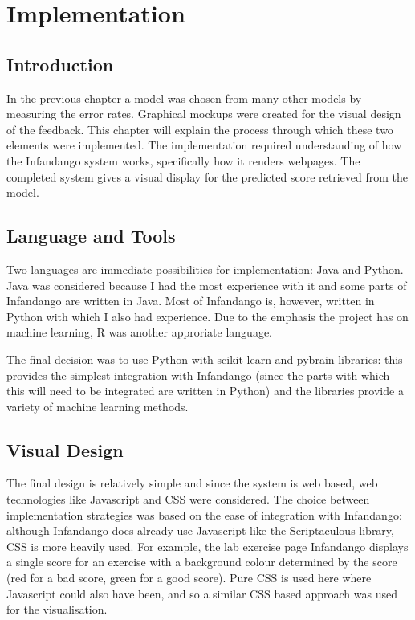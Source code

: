 \chapter{Implementation}
\label{implementation}
\section{Introduction}
In the previous chapter a model was chosen from many other models by measuring the error rates. Graphical mockups were created for the visual design of the feedback. This chapter will explain the process through which these two elements were implemented. The implementation required understanding of how the Infandango system works, specifically how it renders webpages. The completed system gives a visual display for the predicted score retrieved from the model.

\section{Language and Tools}
Two languages are immediate possibilities for implementation: Java\cite{java_site} and Python\cite{python_site}. Java was considered because I had the most experience with it and some parts of Infandango are written in Java. Most of Infandango is, however, written in Python with which I also had experience. Due to the emphasis the project has on machine learning, R\cite{r_site} was another approriate language.

The final decision was to use Python with scikit-learn\cite{scikit_site} and pybrain\cite{pybrain2010jmlr} libraries: this provides the simplest integration with Infandango (since the parts with which this will need to be integrated are written in Python) and the libraries provide a variety of machine learning methods.

\section{Visual Design}
The final design is relatively simple and since the system is web based, web technologies like Javascript and CSS were considered. The choice between implementation strategies was based on the ease of integration with Infandango: although Infandango does already use Javascript like the Scriptaculous library\cite{scriptaculous_site}, CSS is more heavily used. For example, the lab exercise page Infandango displays a single score for an exercise with a background colour determined by the score (red for a bad score, green for a good score). Pure CSS is used here where Javascript could also have been, and so a similar CSS based approach was used for the visualisation.

